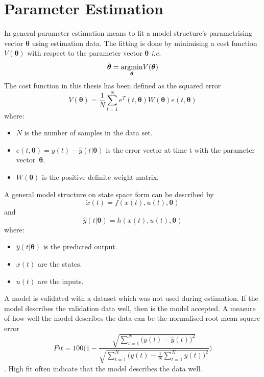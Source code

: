 \section{Parameter Estimation} 
In general parameter estimation means to fit a model structure's parametrising vector $\boldsymbol{\theta}$ using estimation data. The fitting is done by minimising a cost function $V(\boldsymbol{\theta})$ with respect to the parameter vector $\boldsymbol{\theta}$ \emph{i.e.}
\begin{equation}
\hat{\boldsymbol{\theta}} = \underset{\boldsymbol{\theta}}{\operatorname*{\arg\!\min}} V(\boldsymbol{\theta})
\end{equation}
The cost function in this thesis has been defined as the squared error
\begin{equation}
    V(\boldsymbol{\theta}) = \frac{1}{N} \sum_{t=1}^{N} e^T(t,\boldsymbol{\theta}) W(\boldsymbol{\theta})  e(t,\boldsymbol{\theta})
\end{equation}
where:
\begin{itemize}
    \item $N$ is the number of samples in the data set.
    \item $e(t,\boldsymbol{\theta}) = y(t) - \hat{y}(t|\boldsymbol{\theta})$ is the error vector at time t with the parameter vector~$\boldsymbol{\theta}$.
    \item $W(\boldsymbol{\theta})$ is the positive definite weight matrix.
\end{itemize}

A general model structure on state space form can be described by
\begin{equation}
\dot{x}(t) = f(x(t), u(t), \boldsymbol{\theta})
\end{equation}
and
\begin{equation}
\hat{y}(t|\boldsymbol{\theta}) = h(x(t), u(t), \boldsymbol{\theta})
\end{equation}
 where:
 \begin{itemize}
  \item $\hat{y}(t|\boldsymbol{\theta})$ is the predicted output.
  \item $x(t)$ are the states. 
  \item $u(t)$ are the inputs. 
 \end{itemize}

A model is validated with a dataset which was not used during estimation. If the model describes the validation data well, then is the model accepted. A measure of how well the model describes the data can be the normalised root mean square error
\begin{equation}
Fit = 100 \Biggr(1 - \frac{\sqrt{\sum\limits_{t=1}^N \bigr(y(t) - \hat{y}(t)\bigl)^2}}{\sqrt{\sum\limits_{t=1}^N \bigr(y(t)-\frac{1}{N}\sum\limits_{t=1}^N y(t)\bigl)^2}}\Biggl)
\end{equation}. 
High fit often indicate that the model describes the data well. 
